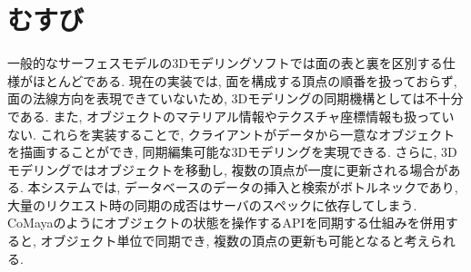 \chapter{むすび} \label{chap:conclusion}
一般的なサーフェスモデルの3Dモデリングソフトでは面の表と裏を区別する仕様がほとんどである.
現在の実装では, 面を構成する頂点の順番を扱っておらず, 面の法線方向を表現できていないため, 3Dモデリングの同期機構としては不十分である. また, オブジェクトのマテリアル情報やテクスチャ座標情報も扱っていない.
これらを実装することで, クライアントがデータから一意なオブジェクトを描画することができ, 同期編集可能な3Dモデリングを実現できる.
さらに, 3Dモデリングではオブジェクトを移動し, 複数の頂点が一度に更新される場合がある. 本システムでは, データベースのデータの挿入と検索がボトルネックであり, 大量のリクエスト時の同期の成否はサーバのスペックに依存してしまう. CoMayaのようにオブジェクトの状態を操作するAPIを同期する仕組みを併用すると, オブジェクト単位で同期でき, 複数の頂点の更新も可能となると考えられる.
